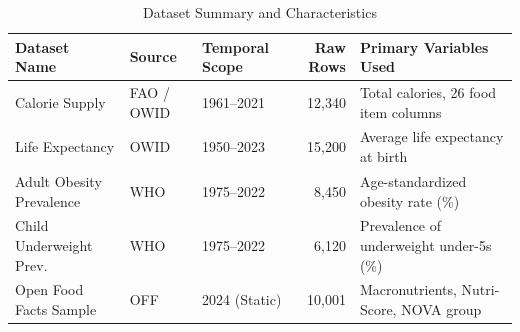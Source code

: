 \documentclass[10pt, a4paper]{article}
\begin{document}
\begin{table}[h]
\centering
\caption{Dataset Summary and Characteristics}
\label{tab:datasets}
\small
\begin{tabular}{lllrl}
\toprule
\textbf{Dataset Name} & \textbf{Source} & \textbf{Temporal Scope} & \textbf{Raw Rows} & \textbf{Primary Variables Used} \\
\midrule
Calorie Supply & FAO / OWID & 1961--2021 & 12,340 & \parbox{4.8cm}{\strut Total calories, 26 food item columns\strut} \\
Life Expectancy & OWID & 1950--2023 & 15,200 & \parbox{4.8cm}{\strut Average life expectancy at birth\strut} \\
Adult Obesity Prevalence & WHO & 1975--2022 & 8,450 & \parbox{4.8cm}{\strut Age-standardized obesity rate (\%)\strut} \\
Child Underweight Prev. & WHO & 1975--2022 & 6,120 & \parbox{4.8cm}{\strut Prevalence of underweight under-5s (\%)\strut} \\
Open Food Facts Sample & OFF & 2024 (Static) & 10,001 & \parbox{4.8cm}{\strut Macronutrients, Nutri-Score, NOVA group\strut} \\
\bottomrule
\end{tabular}
\end{table}
\end{document}

